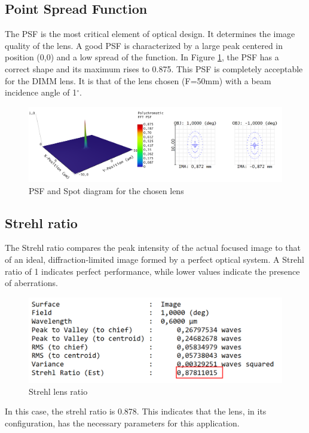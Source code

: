 \subsection{Point Spread Function}
The \gls{PSF} is the most critical element of optical design. It determines the image quality of the lens.
A good \gls{PSF} is characterized by a large peak centered in position (0,0) and a low spread of the function.
\newline
In Figure \ref{fig:Opti_ZemaxPSF}, the \gls{PSF} has a correct shape and its maximum rises to 0.875. This \gls{PSF} is completely acceptable
for the DIMM lens. It is that of the lens chosen (F=50mm) with a beam incidence angle of 1$^{\circ}$.
\begin{figure}[H]
    \centering
    \includegraphics[scale=0.5]{assets/figures/Optical Design/Zemax_PSF.png}
    \caption{PSF and Spot diagram for the chosen lens}
    \label{fig:Opti_ZemaxPSF}
\end{figure}
\subsection{Strehl ratio}
The Strehl ratio compares the peak intensity of the actual focused image to that of an ideal,
diffraction-limited image formed by a perfect optical system. A Strehl ratio of 1 indicates perfect performance,
while lower values indicate the presence of aberrations.
\begin{figure}[H]
    \centering
    \includegraphics[scale=0.8]{assets/figures/Optical Design/Zemax_Strehl.png}
    \caption{Strehl lens ratio}
    \label{fig:Opti_ZemaxStrehl}
\end{figure}
In this case, the strehl ratio is 0.878. This indicates that the lens, in its configuration,
has the necessary parameters for this application.
\newpage
